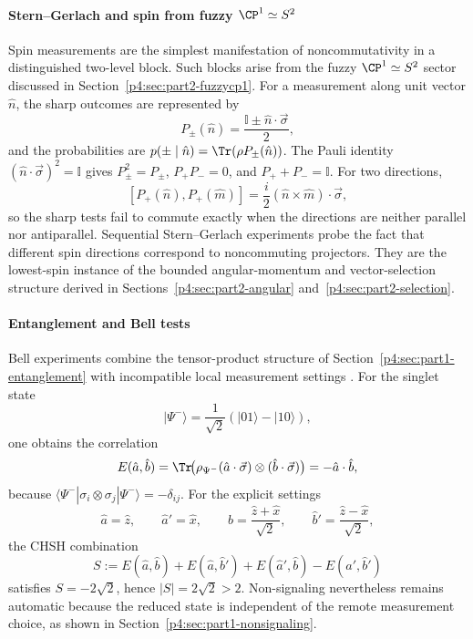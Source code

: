 \documentclass[12pt,a4paper]{article}
\begin{document}
\paragraph{Stern--Gerlach and spin from fuzzy \texorpdfstring{$\CP^1\simeq S^2$}{CP1=S2}}
\label{p4:sec:part2-sg}

Spin measurements are the simplest manifestation of noncommutativity in a distinguished two-level block.
Such blocks arise from the fuzzy $\CP^1\simeq S^2$ sector discussed in Section~\ref{p4:sec:part2-fuzzycp1}.
For a measurement along unit vector $\hat n$, the sharp outcomes are represented by
\[
P_{\pm}(\hat n)=\frac{\mathbb I\pm \hat n\cdot\vec\sigma}{2},
\]
and the probabilities are $p(\pm\mid \hat n)=\Tr(\rho P_{\pm}(\hat n))$.
The Pauli identity
\((\hat n\cdot\vec\sigma)^2=\mathbb I\) gives
\(P_\pm^2=P_\pm\), \(P_+P_-=0\), and \(P_++P_-=\mathbb I\).  For two
directions,
\[
 [P_+(\hat n),P_+(\hat m)]
 =\frac{i}{2}(\hat n\times\hat m)\cdot\vec\sigma,
\]
so the sharp tests fail to commute exactly when the directions are neither
parallel nor antiparallel.
Sequential Stern--Gerlach experiments probe the fact that different spin directions correspond to noncommuting projectors. They are the lowest-spin instance of the bounded angular-momentum and vector-selection structure derived in Sections~\ref{p4:sec:part2-angular} and~\ref{p4:sec:part2-selection}.



\paragraph{Entanglement and Bell tests}
\label{p4:sec:part2-bell}

Bell experiments combine the tensor-product structure of Section~\ref{p4:sec:part1-entanglement} with incompatible local measurement settings \cite{Bell1964,ClauserHorneShimonyHolt1969}.
For the singlet state
\[
|\Psi^-\rangle=\frac1{\sqrt2}(|01\rangle-|10\rangle),
\]
one obtains the correlation
\[
E(\hat a,\hat b)=\Tr\!\bigl(\rho_{\Psi^-}(\hat a\cdot\vec\sigma)\otimes(\hat b\cdot\vec\sigma)\bigr)=-\hat a\cdot\hat b,
\]
because
\(\langle\Psi^-|\sigma_i\otimes\sigma_j|\Psi^-\rangle=-\delta_{ij}\).
For the explicit settings
\[
 \hat a=\hat z,
 \qquad
 \hat a'=\hat x,
 \qquad
 \hat b=\frac{\hat z+\hat x}{\sqrt2},
 \qquad
 \hat b'=\frac{\hat z-\hat x}{\sqrt2},
\]
the CHSH combination
\[
 S:=E(\hat a,\hat b)+E(\hat a,\hat b')
   +E(\hat a',\hat b)-E(\hat a',\hat b')
\]
satisfies \(S=-2\sqrt2\), hence \(|S|=2\sqrt2>2\).
Non-signaling nevertheless remains automatic because the reduced state is independent of the remote measurement choice, as shown in Section~\ref{p4:sec:part1-nonsignaling}.
\end{document}
